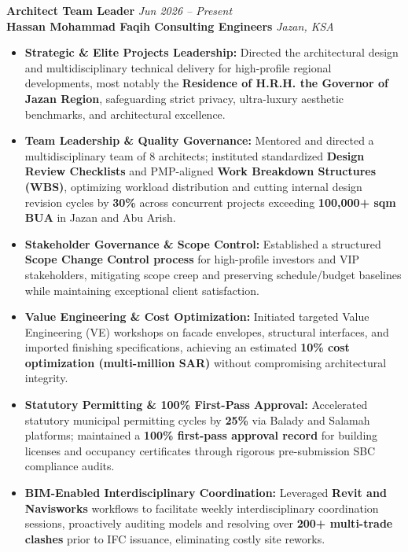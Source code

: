 \documentclass[a4paper,10pt]{article}
\begin{document}
\textbf{Architect Team Leader} \hfill \textit{Jun 2026 -- Present} \\
\textbf{\color{secondary}Hassan Mohammad Faqih Consulting Engineers} \hfill \textit{Jazan, KSA}
\begin{itemize}
    \item \textbf{Strategic \& Elite Projects Leadership:} Directed the architectural design and multidisciplinary technical delivery for high-profile regional developments, most notably the \textbf{Residence of H.R.H. the Governor of Jazan Region}, safeguarding strict privacy, ultra-luxury aesthetic benchmarks, and architectural excellence.
    \item \textbf{Team Leadership \& Quality Governance:} Mentored and directed a multidisciplinary team of 8 architects; instituted standardized \textbf{Design Review Checklists} and PMP-aligned \textbf{Work Breakdown Structures (WBS)}, optimizing workload distribution and cutting internal design revision cycles by \textbf{30\%} across concurrent projects exceeding \textbf{100,000+ sqm BUA} in Jazan and Abu Arish.
    \item \textbf{Stakeholder Governance \& Scope Control:} Established a structured \textbf{Scope Change Control process} for high-profile investors and VIP stakeholders, mitigating scope creep and preserving schedule/budget baselines while maintaining exceptional client satisfaction.
    \item \textbf{Value Engineering \& Cost Optimization:} Initiated targeted Value Engineering (VE) workshops on facade envelopes, structural interfaces, and imported finishing specifications, achieving an estimated \textbf{10\% cost optimization (multi-million SAR)} without compromising architectural integrity.
    \item \textbf{Statutory Permitting \& 100\% First-Pass Approval:} Accelerated statutory municipal permitting cycles by \textbf{25\%} via Balady and Salamah platforms; maintained a \textbf{100\% first-pass approval record} for building licenses and occupancy certificates through rigorous pre-submission SBC compliance audits.
    \item \textbf{BIM-Enabled Interdisciplinary Coordination:} Leveraged \textbf{Revit and Navisworks} workflows to facilitate weekly interdisciplinary coordination sessions, proactively auditing models and resolving over \textbf{200+ multi-trade clashes} prior to IFC issuance, eliminating costly site reworks.
\end{itemize}
\end{document}
